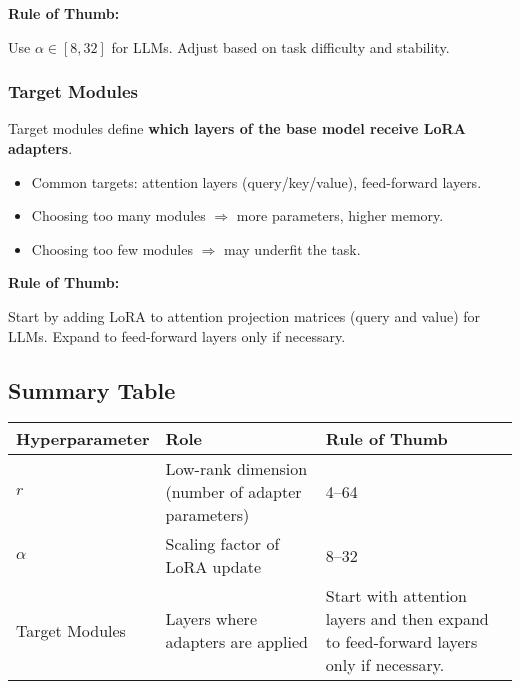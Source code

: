 \textbf{Rule of Thumb:}  
\begin{tcolorbox}[colback=green!5!white,colframe=green!75!black]
Use $\alpha \in [8, 32]$ for LLMs. Adjust based on task difficulty and stability.
\end{tcolorbox}

\subsubsection{Target Modules}
Target modules define \textbf{which layers of the base model receive LoRA adapters}.  

\begin{itemize}
    \item Common targets: attention layers (query/key/value), feed-forward layers.  
    \item Choosing too many modules $\Rightarrow$ more parameters, higher memory.  
    \item Choosing too few modules $\Rightarrow$ may underfit the task.
\end{itemize}

\textbf{Rule of Thumb:}  
\begin{tcolorbox}[colback=yellow!5!white,colframe=yellow!75!black]
Start by adding LoRA to attention projection matrices (query and value) for LLMs. Expand to feed-forward layers only if necessary.
\end{tcolorbox}

\subsection{Summary Table}

\begin{tcolorbox}[colback=gray!5!white,colframe=black,title=LoRA Hyperparameters Summary]
\begin{tabular}{|p{4cm}|p{5cm}|p{6cm}|}
\hline
\textbf{Hyperparameter} & \textbf{Role} & \textbf{Rule of Thumb} \\
\hline
$r$ & Low-rank dimension (number of adapter parameters) & 4--64 \\
\hline
$\alpha$ & Scaling factor of LoRA update & 8--32 \\
\hline
Target Modules & Layers where adapters are applied & Start with attention layers and then expand to feed-forward layers only if necessary. \\
\hline
\end{tabular}
\end{tcolorbox}


